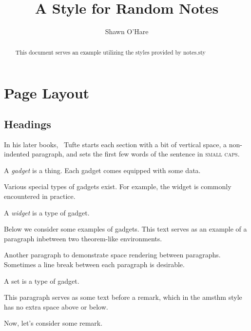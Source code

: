 \documentclass{article}
\title{A Style for Random Notes}
\author{Shawn O'Hare}
\begin{document}
\maketitle

\begin{abstract}
\noindent
This document serves an example utilizing the styles provided by
notes.sty
\end{abstract}

\tableofcontents

\section{Page Layout}\label{sec:page-layout}
\subsection{Headings}\label{sec:headings}

In his later books,~\cite{Tufte2006} Tufte
starts each section with a bit of vertical space, a non-indented paragraph,
and sets the first few words of the sentence in \textsc{small caps}.

\begin{definition}[Gadget]
  A \emph{gadget} is a thing.
  Each gadget comes equipped with some data.
\end{definition}

Various special types of gadgets exist.  For example, the widget is
commonly encountered in practice.

\begin{definition}[widget]
  A \emph{widget} is a type of gadget.
\end{definition}

Below we consider some examples of gadgets.  This text serves as an example of a
paragraph inbetween two theorem-like environments.

Another paragraph to demonstrate space rendering between paragraphs. Sometimes a
line break between each paragraph is desirable.

\begin{example}[Gadget]
  A set is a type of gadget.
\end{example}

This paragraph serves as some text before a remark, which in the
amsthm style has no extra space above or below.

\begin{remark}
  Now, let's consider some remark.
\end{remark}
\end{document}

